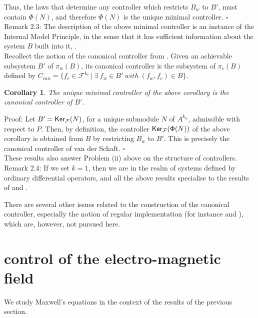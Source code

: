 \documentclass[11pt]{amsart}
\newtheorem{corollary}{Corollary}[section]
\def\ker{\mathop{\sf Ker}}
\newcommand{\F}{\mathcal{F}}
\begin{document}
{Thus, the laws that determine any controller which restricts $B_w$ to $B'$, must contain $\Phi(N)$, and therefore $\Phi(N)$ is the unique minimal controller. \hspace*{\fill}$\square$\\

\noindent Remark 2.3: The description of the above minimal controller is an instance of the Internal Model Principle, in the sense that it has sufficient information about the system $B$ built into it, \cite{fw}.\\

Recollect the notion of the canonical controller from \cite{sc}. Given an achievable subsystem $B'$ of $\pi_w(B)$, its canonical controller is the subsystem of $\pi_c(B)$ defined by $C_{can} = \{ f_c \in \F^{k_c} ~| ~ \exists ~f_w \in B' ~ with ~ (f_w,f_c) \in B \}$.

\begin{corollary} The unique minimal controller of the above corollary is the canonical controller of $B'$. 
\end{corollary}
\noindent Proof: Let $B' = \ker_\F(N)$, for a unique submodule $N$ of $A^{k_w}$, admissible with respect to $P$. Then, by definition, the controller $\ker_\F(\Phi(N))$ of the above corollary is obtained from $B$ by restricting $B_w$ to $B'$. This is precisely the canonical controller of van der Schaft. \hspace*{\fill}$\square$\\

These results also answer Problem (ii) above on the structure of controllers.\\

\noindent Remark 2.4: If we set $k = 1$, then we are in the realm of systems defined by ordinary differential operators, and all the above results specialise to the results of \cite{sc} and \cite{wt}.

There are several other issues related to the construction of the canonical controller, especially the notion of regular implementation (for instance \cite{pr1} and \cite{np}), which are, however, not pursued here.

\section{control of the electro-magnetic field}
We study Maxwell's equations in the context of the results of the previous section.\\

}
\end{document}
